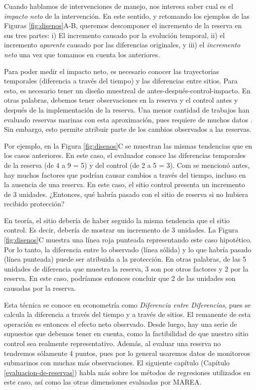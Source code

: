 \documentclass[]{krantz}
\begin{document}
Cuando hablamos de intervenciones de manejo, nos interesa saber cual es el \emph{impacto neto} de la intervención. En este sentido, y retomando los ejemplos de las Figuras \ref{fig:disenos}A-B, queremos descomponer el incremento de la reserva en sus tres partes: i) El incremento causado por la evolución temporal, ii) el incremento \emph{aparente} causado por las diferencias originales, y iii) el \emph{incremento neto} una vez que tomamos en cuenta los anteriores.

Para poder medir el impacto neto, es necesario conocer las trayectorias temporales (diferencia a través del tiempo) y las diferencias entre sitios. Para esto, es necesario tener un diseño muestreal de antes-después-control-impacto. En otras palabras, debemos tener observaciones en la reserva y el control antes y después de la implementación de la reserva. Una menor cantidad de trabajos han evaluado reservas marinas con esta aproximación, pues requiere de muchos datos \citep{moland_2013, villasenorderbez_2018}. Sin embargo, esto permite atribuir parte de los cambios observados a las reservas.

Por ejemplo, en la Figura \ref{fig:disenos}C se muestran las mismas tendencias que en los casos anteriores. En este caso, el evaluador conoce las diferencias temporales de la reserva (de 4 a 9 = 5) y del control (de 2 a 5 = 3). Com se mencionó antes, hay muchos factores que podrían causar cambios a través del tiempo, incluso en la ausencia de una reserva. En este caso, el sitio control presenta un incremento de 3 unidades. ¿Entonces, qué habría pasado con el sitio de reserva si no hubiera recibido protección?

En teoría, el sitio debería de haber seguido la misma tendencia que el sitio control. Es decir, debería de mostrar un incremento de 3 unidades. La Figura \ref{fig:disenos}C muestra una línea roja punteada representando este caso hipotético. Por lo tanto, la diferencia entre lo observado (línea sólida) y lo que habría pasado (línea punteada) puede ser atribuida a la protección. En otras palabras, de las 5 unidades de diferencia que muestra la reserva, 3 son por otros factores y 2 por la reserva. En este caso, podríamos entonces concluir que 2 de las unidades son causadas por la reserva.

Esta técnica se conoce en econometría como \emph{Diferencia entre Diferencias}, pues se calcula la diferencia a través del tiempo y a través de sitios. El remanente de esta operación es entonces el efecto neto observado. Desde luego, hay una serie de supuestos que debemos tener en cuenta, como la factibilidad de que nuestro sitio control sea realmente representativo. Además, al evaluar una reserva no tendremos sólamente 4 puntos, pues por lo general usaremos datos de monitoreos submarinos con muchas más observaciones. El siguiente capítulo (Capítulo \ref{evaluacion-de-reservas}) habla más sobre los métodos de regresiones utilizados en este caso, así como las otras dimensiones evaluadas por MAREA.
\end{document}
